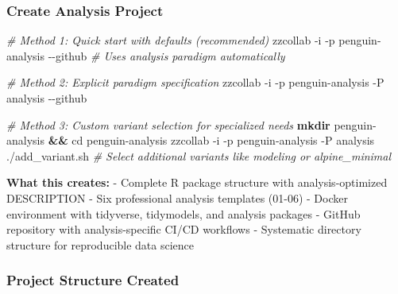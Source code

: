 \documentclass[
]{article}
\newenvironment{Shaded}{\begin{snugshade}}{\end{snugshade}}
\newcommand{\AttributeTok}[1]{\textcolor[rgb]{0.13,0.29,0.53}{#1}}
\newcommand{\BuiltInTok}[1]{#1}
\newcommand{\CommentTok}[1]{\textcolor[rgb]{0.56,0.35,0.01}{\textit{#1}}}
\newcommand{\ExtensionTok}[1]{#1}
\newcommand{\FunctionTok}[1]{\textcolor[rgb]{0.13,0.29,0.53}{\textbf{#1}}}
\newcommand{\KeywordTok}[1]{\textcolor[rgb]{0.13,0.29,0.53}{\textbf{#1}}}
\newcommand{\NormalTok}[1]{#1}
\begin{document}
\subsubsection{Create Analysis Project}\label{create-analysis-project}

\begin{Shaded}
\begin{Highlighting}[]
\CommentTok{\# Method 1: Quick start with defaults (recommended)}
\ExtensionTok{zzcollab} \AttributeTok{{-}i} \AttributeTok{{-}p}\NormalTok{ penguin{-}analysis }\AttributeTok{{-}{-}github}    \CommentTok{\# Uses analysis paradigm automatically}

\CommentTok{\# Method 2: Explicit paradigm specification}
\ExtensionTok{zzcollab} \AttributeTok{{-}i} \AttributeTok{{-}p}\NormalTok{ penguin{-}analysis }\AttributeTok{{-}P}\NormalTok{ analysis }\AttributeTok{{-}{-}github}

\CommentTok{\# Method 3: Custom variant selection for specialized needs}
\FunctionTok{mkdir}\NormalTok{ penguin{-}analysis }\KeywordTok{\&\&} \BuiltInTok{cd}\NormalTok{ penguin{-}analysis}
\ExtensionTok{zzcollab} \AttributeTok{{-}i} \AttributeTok{{-}p}\NormalTok{ penguin{-}analysis }\AttributeTok{{-}P}\NormalTok{ analysis}
\ExtensionTok{./add\_variant.sh}    \CommentTok{\# Select additional variants like modeling or alpine\_minimal}
\end{Highlighting}
\end{Shaded}

\textbf{What this creates:} - Complete R package structure with
analysis-optimized DESCRIPTION - Six professional analysis templates
(01-06) - Docker environment with tidyverse, tidymodels, and analysis
packages - GitHub repository with analysis-specific CI/CD workflows -
Systematic directory structure for reproducible data science

\subsubsection{Project Structure
Created}\label{project-structure-created}
\end{document}
